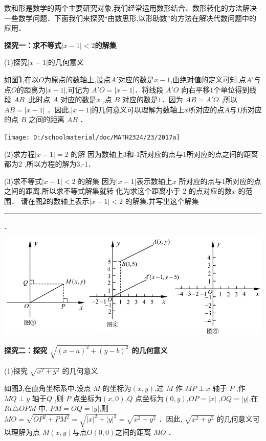 \documentclass[10pt,a4paper]{ctexart}
\newcommand{\nianfen}[1]{\hspace{-2em}{(#1\textbf{·}\textit{青岛}\textbf{·}23)}}
\newcommand{\kong}{\rule{4em}{0.5pt}}
\begin{document}
	\nianfen{2017}数和形是数学的两个主要研究对象,我们经常运用数形结合、数形转化的方法解决一些数学问题．下面我们来探究“由数思形,以形助数”的方法在解决代数问题中的应用．
	
	\textbf{探究一：求不等式$|x-1|<2$的解集}
	
	(1)探究$|x-1|$的几何意义
	
	如图\textcircled{1},在以$O$为原点的数轴上,设点$ A' $对应的数是$x-1 $,由绝对值的定义可知,点$  A' $与点$ O  $的距离为$ |x-1| $,可记为 $ A'O=|x-1| $．将线段 $ A'O $ 向右平移$ 1 $个单位得到线段 $ AB $ ,此时点 $ A $ 对应的数是$x $ ,点 $ B $ 对应的数是$ 1 $．因为 $ AB= A'O $ ,所以 $ AB=|x-1| $ ．因此,$ |x-1| $的几何意义可以理解为数轴上$x  $所对应的点$  A  $与$ 1 $所对应的点 $ B $ 之间的距离 $ AB $ ．
	
	\begin{center}
		\texttt{[image: D:/schoolmaterial/doc/MATH2324/23/2017a]}
	\end{center}
	
	(2)求方程$ |x-1|=2 $ 的解
	因为数轴上3和-1所对应的点与1所对应的点之间的距离都为2 ,所以方程的解为3,-1．
	
	(3)求不等式$ |x-1|<2 $ 的解集
	因为$ |x-1| $表示数轴上$ x $ 所对应的点与1所对应的点之间的距离,所以求不等式解集就转
	化为求这个距离小于 2 的点对应的数$ x $ 的范围．
	请在图\textcircled{2}的数轴上表示$ |x-1|<2 $ 的解集,并写出这个解集\kong．
	
	\begin{center}
		\includegraphics[width=0.9\linewidth]{23/2017b}
	\end{center}
	
	\textbf{探究二：探究 $ \sqrt{(x-a)^2+(y-b)^2} $ 的几何意义}
	
	(1)探究 $ \sqrt{x^2+y^2} $ 的几何意义
	
	如图\textcircled{3},在直角坐标系中,设点 $ M $ 的坐标为$ (x,y) $,过 $ M $ 作 $ MP\perp  x $ 轴于 $ P $ ,作 $ MQ\perp  y $
	轴于$ Q $ ,则 $ P $ 点坐标为$ (x,0) $,$ Q $ 点坐标为$ (0,y) $,$ OP=|x| $ ,$ OQ=|y| $,在 $ Rt\triangle  OPM $ 中,
	$ PM=OQ=|y| $,则 $ MO=\sqrt{OP^2+PM^2}=\sqrt{|x|^2+|y|^2}=\sqrt{x^2+y^2} $ ．因此, $\sqrt{x^2+y^2}$ 的几何意义可以理解为点 $ M(x,y) $与点$ O(0,0) $之间的距离 $ MO $ ．
	
\end{document}
